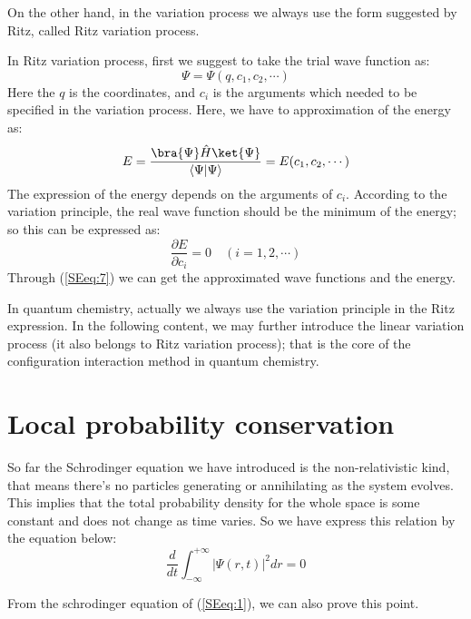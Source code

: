 On the other hand, in the variation process we always use the form
suggested by Ritz, called Ritz variation process.

In Ritz variation process, first we suggest to take the trial wave
function as:
\begin{equation}\label{}
\Psi = \Psi(q, c_{1}, c_{2}, \cdots)
\end{equation}
Here the $q$ is the coordinates, and $c_{i}$ is the arguments which
needed to be specified in the variation process. Here, we have to
approximation of the energy as:
\begin{equation}\label{}
E = \frac{\bra{\Psi}\hat{H}\ket{\Psi}}{\langle\Psi|\Psi\rangle}
=E(c_{1}, c_{2}, \cdots)
\end{equation}
The expression of the energy depends on the arguments of $c_{i}$.
According to the variation principle, the real wave function should
be the minimum of the energy; so this can be expressed as:
\begin{equation}\label{SEeq:7}
\frac{\partial E}{\partial c_{i}} = 0 \quad (i=1,2,\cdots)
\end{equation}
Through (\ref{SEeq:7}) we can get the approximated wave functions
and the energy.

In quantum chemistry, actually we always use the variation principle
in the Ritz expression. In the following content, we may further
introduce the linear variation process (it also belongs to Ritz
variation process); that is the core of the configuration
interaction method in quantum chemistry.

\section{Local probability conservation}
\label{lpc_in_schrodinger}
%
%
So far the Schrodinger equation we have introduced is the
non-relativistic kind, that means there's no particles generating or
annihilating as the system evolves. This implies that the total
probability density for the whole space is some constant and does
not change as time varies. So we have express this relation by the
equation below:
\begin{equation}\label{SEeq:15}
\frac{d}{dt}\int^{+\infty}_{-\infty}|\Psi(r,t)|^{2}dr = 0
\end{equation}

From the schrodinger equation of (\ref{SEeq:1}), we can also prove
this point.

